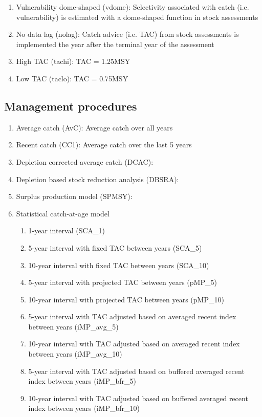 \documentclass[12pt,english]{article}
\begin{document}
\begin{flushleft}
\begin{spacing}{1.9}
\begin{enumerate}
\item Vulnerability dome-shaped (vdome): Selectivity associated with catch (i.e. vulnerability) is estimated with a dome-shaped function in stock assessments
\item No data lag (nolag): Catch advice (i.e. TAC) from stock assessments is implemented the year after the terminal year of the assessment
\item High TAC (tachi): TAC = 1.25MSY
\item Low TAC (taclo): TAC = 0.75MSY
\end{enumerate}

\subsection*{Management procedures}

\begin{enumerate}
\item Average catch (AvC): Average catch over all years
\item Recent catch (CC1): Average catch over the last 5 years
\item Depletion corrected average catch (DCAC):
\item Depletion based stock reduction analysis (DBSRA):
\item Surplus production model (SPMSY):
\item Statistical catch-at-age model
\begin{enumerate}
\item 1-year interval (SCA\_1)
\item 5-year interval with fixed TAC between years (SCA\_5)
\item 10-year interval with fixed TAC between years (SCA\_10)
\item 5-year interval with projected TAC between years (pMP\_5)
\item 10-year interval with projected TAC between years (pMP\_10)
\item 5-year interval with TAC adjusted based on averaged recent index between years  (iMP\_avg\_5)
\item 10-year interval with TAC adjusted based on averaged recent index between years  (iMP\_avg\_10)
\item 5-year interval with TAC adjusted based on buffered averaged recent index between years  (iMP\_bfr\_5)
\item 10-year interval with TAC adjusted based on buffered averaged recent index between years  (iMP\_bfr\_10)
\end{enumerate}
\end{enumerate}


\end{spacing}
\end{flushleft}
\end{document}

